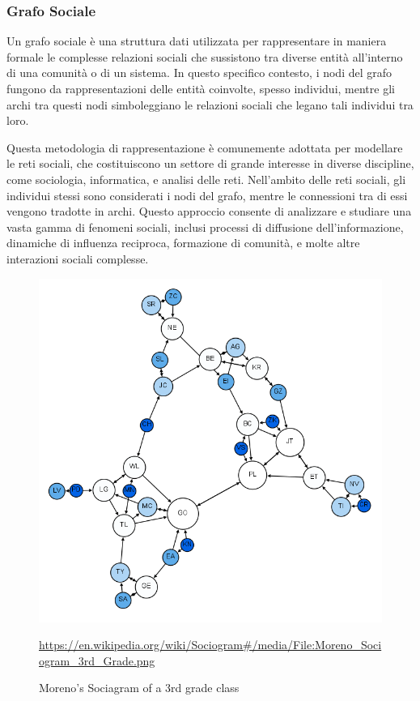 \subsubsection*{Grafo Sociale}

Un grafo sociale è una struttura dati utilizzata per rappresentare in 
maniera formale le complesse relazioni sociali che sussistono tra diverse 
entità all'interno di una comunità o di un sistema. In questo specifico 
contesto, i nodi del grafo fungono da rappresentazioni delle entità 
coinvolte, spesso individui, mentre gli archi tra questi nodi 
simboleggiano le relazioni sociali che legano tali individui tra loro.

Questa metodologia di rappresentazione è comunemente adottata per 
modellare le reti sociali, che costituiscono un settore di grande 
interesse in diverse discipline, come sociologia, informatica, e analisi 
delle reti. Nell'ambito delle reti sociali, gli individui stessi sono 
considerati i nodi del grafo, mentre le connessioni tra di essi vengono 
tradotte in archi. Questo approccio consente di analizzare e studiare 
una vasta gamma di fenomeni sociali, inclusi processi di diffusione 
dell'informazione, dinamiche di influenza reciproca, 
formazione di comunità, e molte altre interazioni sociali complesse.

\begin{figure}[H]
    \begin{center}
		\includegraphics[scale=0.6]{img/Moreno_Sociogram_3rd_Grade.png}
		\caption{Moreno's Sociagram of a 3rd grade class}
		\url{https://en.wikipedia.org/wiki/Sociogram#/media/File:Moreno_Sociogram_3rd_Grade.png}
		\label{fig:social_graph}
		\end{center}
\end{figure}

